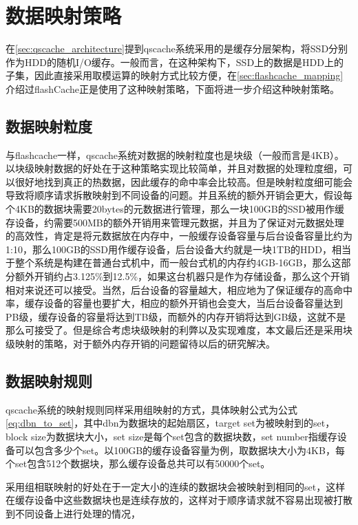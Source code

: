 \section{数据映射策略}
在\ref{sec:qscache_architecture}提到qscache系统采用的是缓存分层架构，将SSD分别作为HDD的随机I/O缓存。一般而言，在这种架构下，SSD上的数据是HDD上的子集，因此直接采用取模运算的映射方式比较方便，在\ref{sec:flashcache_mapping}介绍过flashCache正是使用了这种映射策略，下面将进一步介绍这种映射策略。 

\subsection{数据映射粒度}

与flashcache一样，qscache系统对数据的映射粒度也是块级（一般而言是4KB）。以块级映射数据的好处在于这种策略实现比较简单，并且对数据的处理粒度细，可以很好地找到真正的热数据，因此缓存的命中率会比较高。但是映射粒度细可能会导致将顺序请求拆散映射到不同设备的问题。并且系统的额外开销会更大，假设每个4KB的数据块需要20bytes的元数据进行管理，那么一块100GB的SSD被用作缓存设备，约需要500MB的额外开销用来管理元数据，并且为了保证对元数据处理的高效性，肯定是将元数据放在内存中，一般缓存设备容量与后台设备容量比约为1:10，那么100GB的SSD用作缓存设备，后台设备大约就是一块1TB的HDD，相当于整个系统是构建在普通台式机中，而一般台式机的内存约4GB-16GB，那么这部分额外开销约占3.125\%到12.5\%，如果这台机器只是作为存储设备，那么这个开销相对来说还可以接受。当然，后台设备的容量越大，相应地为了保证缓存的高命中率，缓存设备的容量也要扩大，相应的额外开销也会变大，当后台设备容量达到PB级，缓存设备的容量将达到TB级，而额外的内存开销将达到GB级，这就不是那么可接受了。但是综合考虑块级映射的利弊以及实现难度，本文最后还是采用块级映射的策略，对于额外内存开销的问题留待以后的研究解决。

\subsection{数据映射规则}

qscache系统的映射规则同样采用组映射的方式，具体映射公式为公式\ref{eq:dbn_to_set}，其中dbn为数据块的起始扇区，target set为被映射到的set，block size为数据块大小，set size是每个set包含的数据块数，set number指缓存设备可以包含多少个set。以100GB的缓存设备容量为例，取数据块大小为4KB，每个set包含512个数据块，那么缓存设备总共可以有50000个set。

采用组相联映射的好处在于一定大小的连续的数据块会被映射到相同的set，这样在缓存设备中这些数据块也是连续存放的，这样对于顺序请求就不容易出现被打散到不同设备上进行处理的情况，

